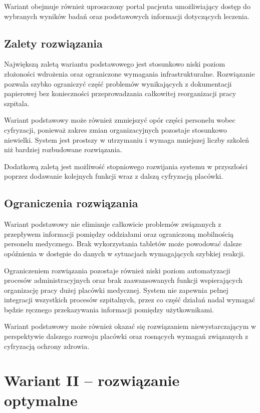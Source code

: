 Wariant obejmuje również uproszczony portal pacjenta umożliwiający dostęp do wybranych wyników badań oraz podstawowych informacji dotyczących leczenia. 

\subsection{Zalety rozwiązania}
Największą zaletą wariantu podstawowego jest stosunkowo niski poziom złożoności wdrożenia oraz ograniczone wymagania infrastrukturalne. Rozwiązanie pozwala szybko ograniczyć część problemów wynikających z dokumentacji papierowej bez konieczności przeprowadzania całkowitej reorganizacji pracy szpitala.

Wariant podstawowy może również zmniejszyć opór części personelu wobec cyfryzacji, ponieważ zakres zmian organizacyjnych pozostaje stosunkowo niewielki. System jest prostszy w utrzymaniu i wymaga mniejszej liczby szkoleń niż bardziej rozbudowane rozwiązania.

Dodatkową zaletą jest możliwość stopniowego rozwijania systemu w przyszłości poprzez dodawanie kolejnych funkcji wraz z dalszą cyfryzacją placówki.

\subsection{Ograniczenia rozwiązania}
Wariant podstawowy nie eliminuje całkowicie problemów związanych z przepływem informacji pomiędzy oddziałami oraz ograniczoną mobilnością personelu medycznego. Brak wykorzystania tabletów może powodować dalsze opóźnienia w dostępie do danych w sytuacjach wymagających szybkiej reakcji.

Ograniczeniem rozwiązania pozostaje również niski poziom automatyzacji procesów administracyjnych oraz brak zaawansowanych funkcji wspierających organizację pracy dużej placówki medycznej. System nie zapewnia pełnej integracji wszystkich procesów szpitalnych, przez co część działań nadal wymagać będzie ręcznego przekazywania informacji pomiędzy użytkownikami.

Wariant podstawowy może również okazać się rozwiązaniem niewystarczającym w perspektywie dalszego rozwoju placówki oraz rosnących wymagań związanych z cyfryzacją ochrony zdrowia.

\section{Wariant II – rozwiązanie optymalne}

